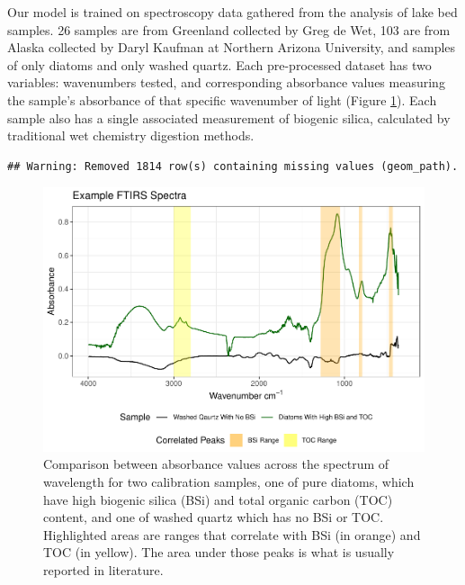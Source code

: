 \documentclass[water,article,submit,moreauthors,pdftex]{mdpi}
\begin{document}
Our model is trained on spectroscopy data gathered from the analysis of
lake bed samples. 26 samples are from Greenland collected by Greg de
Wet, 103 are from Alaska collected by Daryl Kaufman at Northern Arizona
University, and samples of only diatoms and only washed quartz. Each
pre-processed dataset has two variables: wavenumbers tested, and
corresponding absorbance values measuring the sample's absorbance of
that specific wavenumber of light (Figure \ref{fig:fig1}). Each sample
also has a single associated measurement of biogenic silica, calculated
by traditional wet chemistry digestion methods.

\begin{verbatim}
## Warning: Removed 1814 row(s) containing missing values (geom_path).
\end{verbatim}

\begin{figure}

{\centering \includegraphics{final_paper_draft_files/figure-latex/fig1-1} 

}

\caption{Comparison between absorbance values across the spectrum of wavelength for two calibration samples, one of pure diatoms, which have high biogenic silica (BSi) and total organic carbon (TOC) content, and one of washed quartz which has no BSi or TOC. Highlighted areas are ranges that correlate with BSi (in orange) and TOC (in yellow). The area under those peaks is what is usually reported in literature.}\label{fig:fig1}
\end{figure}
\end{document}
